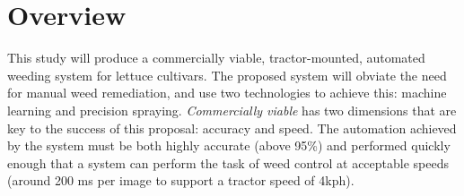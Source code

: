 \documentclass[letterpaper]{article}
\begin{document}
\section{Overview}

\label{section:proposal}
This study will produce a commercially viable, tractor-mounted, automated weeding system for lettuce cultivars. The proposed system will obviate the need for manual weed remediation, and use two technologies to achieve this: machine learning and precision spraying. \textit{Commercially viable} has two dimensions that are key to the success of this proposal: accuracy and speed. The automation achieved by the system must be both highly accurate (above 95\%) and performed quickly enough that a system can perform the task of weed control at acceptable speeds (around 200 ms per image to support a tractor speed of 4kph). 
\end{document}
